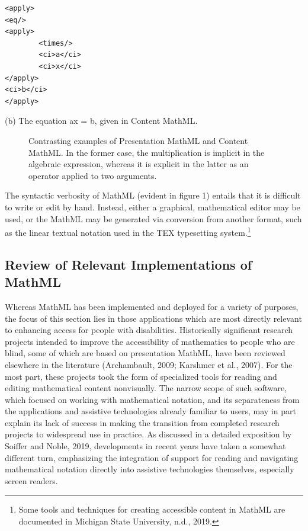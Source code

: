 \documentclass[11.5pt]{sig-alternate} %
\begin{document}
\begin{large}
\begin{verbatim}
<apply>
<eq/>
<apply>
        <times/>
        <ci>a</ci>
        <ci>x</ci>
</apply>
<ci>b</ci>
</apply>
\end{verbatim}
\begin{normalsize}
(b)	The equation ax = b, given in Content MathML.
\end{normalsize}

\begin{figure}[h]
    \caption{Contrasting examples of Presentation MathML and Content MathML. In the former case, the multiplication is implicit in the algebraic expression, whereas it is explicit in the latter as an operator applied to two arguments.}
\end{figure}

The syntactic verbosity of MathML (evident in figure 1) entails that it is difficult to write or edit by hand. Instead, either a graphical, mathematical editor may be used, or the MathML may be generated via conversion from another format, such as the linear textual notation used in the TEX typesetting system.\footnote{Some tools and techniques for creating accessible content in MathML are documented in Michigan State University, n.d., 2019.}

\subsection*{Review of Relevant Implementations of MathML}
 
Whereas MathML has been implemented and deployed for a variety of purposes, the focus of this section lies in those applications which are most directly relevant to enhancing access for people with disabilities. Historically significant research projects intended to improve the accessibility of mathematics to people who are blind, some of which are based on presentation MathML, have been reviewed elsewhere in the literature (Archambault, 2009; Karshmer et al., 2007). For the most part, these projects took the form of specialized tools for reading and editing mathematical content nonvisually. The narrow scope of such software, which focused on working with mathematical notation, and its separateness from the applications and assistive technologies already familiar to users, may in part explain its lack of success in making the transition from completed research projects to widespread use in practice. As discussed in a detailed exposition by Soiffer and Noble, 2019, developments in recent years have taken a somewhat different turn, emphasizing the integration of support for reading and navigating mathematical notation directly into assistive technologies themselves, especially screen readers.


\end{large}
\end{document}
